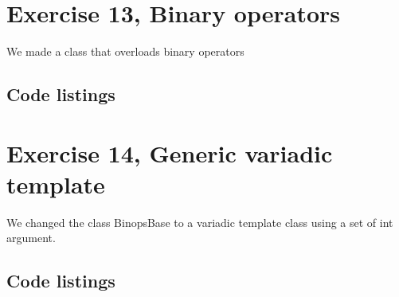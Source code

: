 \documentclass[11pt]{article}
\begin{document}
\section*{Exercise 13, Binary operators}
We made a class that overloads binary operators

\subsection*{Code listings}











\section*{Exercise 14, Generic variadic template }
We changed the class BinopsBase to a variadic template class using a set of int argument.

\subsection*{Code listings}






\end{document}
